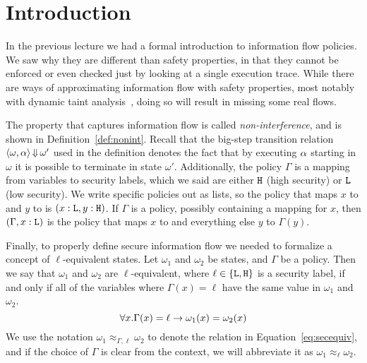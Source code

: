 \documentclass[11pt,twoside]{scrartcl}
\begin{document}
\newcommand{\atrace}{\sigma}%
\newcommand{\stdI}{\dTLint[state=\omega]}%
\newcommand{\Ip}{\dTLint[trace=\atrace]}%
\newcommand{\ws}{\omega}\newcommand{\wt}{\nu}%

\maketitle
\thispagestyle{empty}


\section{Introduction}

In the previous lecture we had a formal introduction to information flow policies. We saw why they are different than safety properties, in that they cannot be enforced or even checked just by looking at a single execution trace. While there are ways of approximating information flow with safety properties, most notably with dynamic taint analysis~\cite{Schwartz2010}, doing so will result in missing some real flows.

The property that captures information flow is called \emph{non-interference}, and is shown in Definition~\ref{def:nonint}. Recall that the big-step transition relation $\langle \omega, \alpha\rangle \operatorname{\Downarrow} \omega'$ used in the definition denotes the fact that by executing $\alpha$ starting in $\omega$ it is possible to terminate in state $\omega'$. Additionally, the policy $\Gamma$ is a mapping from variables to security labels, which we said are either $\texttt{\upshape H}$ (high security) or $\texttt{\upshape L}$ (low security). We write specific policies out as lists, so the policy that maps $x$ to \lowsec and $y$ to \hisec is $(x:\texttt{\upshape L}, y:\texttt{\upshape H})$. If $\Gamma$ is a policy, possibly containing a mapping for $x$, then $(\Gamma, x:\texttt{\upshape L})$ is the policy that maps $x$ to \lowsec and everything else $y$ to $\Gamma(y)$.

Finally, to properly define secure information flow we needed to formalize a concept of $\ell$-equivalent states. Let $\omega_1$ and $\omega_2$ be states, and $\Gamma$ be a policy. Then we say that $\omega_1$ and $\omega_2$ are $\ell$-equivalent, where $\ell \in \{\texttt{\upshape L},\texttt{\upshape H}\}$ is a security label, if and only if all of the variables where $\Gamma(x) = \ell$ have the same value in $\omega_1$ and $\omega_2$.
\begin{equation}
\label{eq:secequiv}
\forall x . \Gamma(x) = \ell \limply \omega_1(x) = \omega_2(x)
\end{equation}
We use the notation $\omega_1 \approx_{\Gamma,\ell} \omega_2$ to denote the relation in Equation~\ref{eq:secequiv}, and if the choice of $\Gamma$ is clear from the context, we will abbreviate it as $\omega_1 \approx_{\ell} \omega_2$.
\end{document}
